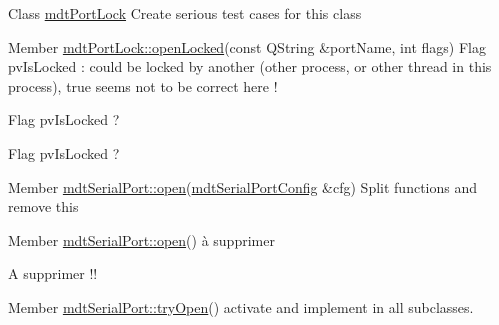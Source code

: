 \label{todo__todo000004}
\hypertarget{todo__todo000004}{}
 
\begin{DoxyDescription}
\item[Class \hyperlink{classmdt_port_lock}{mdtPortLock} ]Create serious test cases for this class 
\end{DoxyDescription}

\label{todo__todo000001}
\hypertarget{todo__todo000001}{}
 
\begin{DoxyDescription}
\item[Member \hyperlink{classmdt_port_lock_a25e9a2cb8a10069fae75c76b6809c27f}{mdtPortLock::openLocked}(const QString \&portName, int flags) ]Flag pvIsLocked : could be locked by another (other process, or other thread in this process), true seems not to be correct here ! 

Flag pvIsLocked ? 

Flag pvIsLocked ? 
\end{DoxyDescription}

\label{todo__todo000011}
\hypertarget{todo__todo000011}{}
 
\begin{DoxyDescription}
\item[Member \hyperlink{classmdt_serial_port_a523cc099b9fff06c46ce1c251646ca20}{mdtSerialPort::open}(\hyperlink{classmdt_serial_port_config}{mdtSerialPortConfig} \&cfg) ]Split functions and remove this 
\end{DoxyDescription}

\label{todo__todo000013}
\hypertarget{todo__todo000013}{}
 
\begin{DoxyDescription}
\item[Member \hyperlink{classmdt_serial_port_ae62fbd70485c30db13c6384c169925c9}{mdtSerialPort::open}() ]à supprimer

A supprimer !! 
\end{DoxyDescription}

\label{todo__todo000012}
\hypertarget{todo__todo000012}{}
 
\begin{DoxyDescription}
\item[Member \hyperlink{classmdt_serial_port_a75750b52566e8448ee2eef649903fdb0}{mdtSerialPort::tryOpen}() ]activate and implement in all subclasses. 
\end{DoxyDescription}

\label{todo__todo000005}
\hypertarget{todo__todo000005}{}
 
